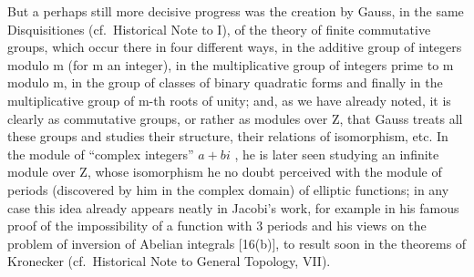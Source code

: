 But a perhaps still more decisive progress was the creation by Gauss, in the same Disquisitiones (cf.~Historical Note to I), of the theory of finite commutative groups, which occur there in four different ways, in the additive group of integers modulo m (for m an integer), in the multiplicative group of integers prime to m modulo m, in the group of classes of binary quadratic forms and finally in the multiplicative group of m-th roots of unity; and, as we have already noted, it is clearly as commutative groups, or rather as modules over Z, that Gauss treats all these groups and studies their structure, their relations of isomorphism, etc. In the module of ``complex integers'' \(a + bi\) , he is later seen studying an infinite module over Z, whose isomorphism he no doubt perceived with the module of periods (discovered by him in the complex domain) of elliptic functions; in any case this idea already appears neatly in Jacobi's work, for example in his famous proof of the impossibility of a function with 3 periods and his views on the problem of inversion of Abelian integrals {[}16(b){]}, to result soon in the theorems of Kronecker (cf.~Historical Note to General Topology, VII).

